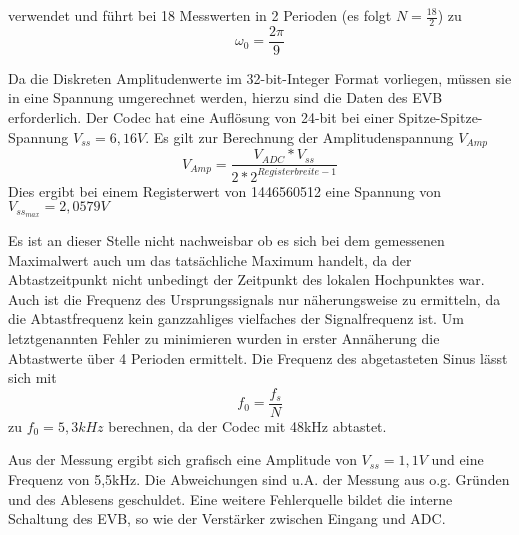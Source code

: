 verwendet und führt bei 18 Messwerten in 2 Perioden (es folgt \begin{math}N=\frac{18}{2}\end{math}) zu 
\begin{equation*}
 \omega_0=\frac{2\pi}9 
\end{equation*}

Da die Diskreten Amplitudenwerte im 32-bit-Integer Format vorliegen, müssen sie in eine Spannung umgerechnet werden, hierzu sind die Daten des EVB erforderlich.
Der Codec hat eine Auflösung von 24-bit bei einer Spitze-Spitze-Spannung \begin{math}V_{ss}=6,16V\end{math}.\pagebreak
Es gilt zur Berechnung der Amplitudenspannung \begin{math}V_{Amp}\end{math}
\begin{equation}\label{umrechnungRegisterzuSpannung}
  V_{Amp}=\frac{V_{ADC}*V_{ss}}{2*2^{Registerbreite-1}}
\end{equation} 
Dies ergibt bei einem Registerwert von 1446560512 eine Spannung von 
\begin{math}V_{ss_{max}}=2,0579V\end{math}\\\par
Es ist an dieser Stelle nicht nachweisbar ob es sich bei dem gemessenen Maximalwert auch um das tatsächliche Maximum handelt, 
da der Abtastzeitpunkt nicht unbedingt der Zeitpunkt des lokalen Hochpunktes war.
Auch ist die Frequenz des Ursprungssignals nur näherungsweise zu ermitteln, da die Abtastfrequenz kein ganzzahliges vielfaches der Signalfrequenz ist. 
Um letztgenannten Fehler zu minimieren wurden in erster Annäherung die Abtastwerte über 4 Perioden ermittelt.
Die Frequenz des abgetasteten Sinus lässt sich mit
\begin{equation}\label{freqAbgetastetesSignal}
 f_0=\frac{f_s}N 
\end{equation}  
zu \begin{math}f_0 = 5,3kHz\end{math} berechnen, da der Codec mit 48kHz 
abtastet.\\\par
Aus der Messung ergibt sich grafisch eine Amplitude von \begin{math}V_{ss}=1,1V\end{math} und eine Frequenz von 5,5kHz. 
Die Abweichungen sind u.A. der Messung aus o.g. Gründen und des Ablesens geschuldet. 
Eine weitere Fehlerquelle bildet die interne Schaltung des EVB, so wie der Verstärker zwischen Eingang und ADC.

